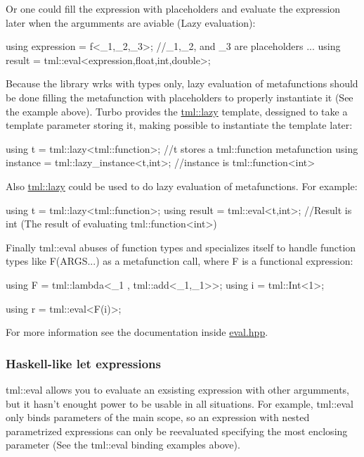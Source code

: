 Or one could fill the expression with placeholders and evaluate the expression later when the argumments are aviable (Lazy evaluation)\+: \begin{DoxyVerb}using expression = f<_1,_2,_3>; //_1,_2, and _3 are placeholders
...
using result = tml::eval<expression,float,int,double>;
\end{DoxyVerb}


Because the library wrks with types only, lazy evaluation of metafunctions should be done filling the metafunction with placeholders to properly instantiate it (See the example above). Turbo provides the {\ttfamily \hyperlink{structtml_1_1lazy}{tml\+::lazy}} template, dessigned to take a template parameter storing it, making possible to instantiate the template later\+: \begin{DoxyVerb}using t = tml::lazy<tml::function>; //t stores a tml::function metafunction
using instance = tml::lazy_instance<t,int>; //instance is tml::function<int>
\end{DoxyVerb}


Also {\ttfamily \hyperlink{structtml_1_1lazy}{tml\+::lazy}} could be used to do lazy evaluation of metafunctions. For example\+: \begin{DoxyVerb}using t = tml::lazy<tml::function>;
using result = tml::eval<t,int>; //Result is int (The result of evaluating tml::function<int>)
\end{DoxyVerb}


Finally {\ttfamily tml\+::eval} abuses of function types and specializes itself to handle function types like {\ttfamily F(A\+R\+G\+S...)} as a metafunction call, where {\ttfamily F} is a functional expression\+: \begin{DoxyVerb}using F = tml::lambda<_1 , tml::add<_1,_1>>;
using i = tml::Int<1>;

using r = tml::eval<F(i)>;
\end{DoxyVerb}


For more information see the documentation inside {\ttfamily \hyperlink{eval_8hpp_source}{eval.\+hpp}}.

\subsubsection*{Haskell-\/like let expressions}

{\ttfamily tml\+::eval} allows you to evaluate an exsisting expression with other argumments, but it hasn't enought power to be usable in all situations. For example, {\ttfamily tml\+::eval} only binds parameters of the main scope, so an expression with nested parametrized expressions can only be reevaluated specifying the most enclosing parameter (See the tml\+::eval binding examples above).

